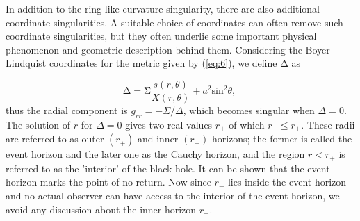 \documentclass[12pt,a4paper,oneside]{book}
\newcommand{\eq}[2]{\begin{equation} \label{eq:#1} #2 \end{equation}}
\newcommand{\Eref}[1]{(\ref{eq:#1})}
\begin{document}
In addition to the ring-like curvature singularity, there are also additional coordinate singularities. A suitable choice of coordinates can often remove such coordinate singularities, but they often underlie some important physical phenomenon and geometric description behind them. Considering the Boyer-Lindquist coordinates for the metric given by \Eref{6}, we define $\mathrm{\Delta }$ as

\eq{Horizon_cond}{\mathrm{\Delta }=\mathrm{\Sigma }\frac{s\left(r,\theta \right)}{X\left(r,\theta \right)}+a^2{{\mathrm{sin}}^2 \theta, \ }} 
thus the radial component is $g_{rr} = -\Sigma/\Delta$, which becomes singular when $\Delta = 0$. The solution of $r$ for $\Delta = 0$ gives two real values $r_\pm$ of which $r_-\leq r_{+}$. These radii are referred to as outer $(r_+)$ and inner $(r_-)$ horizons; the former is called the event horizon and the later one as the Cauchy horizon, and the region $r<r_+$ is referred to as the 'interior' of the black hole. It can be shown that the event horizon marks the point of no return. Now since $r_{-}$ lies inside the event horizon and no actual observer can have access to the interior of the event horizon, we avoid any discussion about the inner horizon $r_{-}$. 
\end{document}
